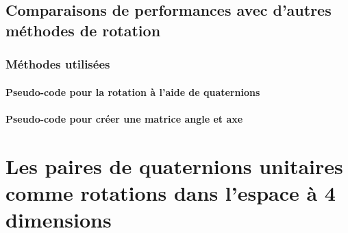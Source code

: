 	\subsection[Performances autres rotations]{Comparaisons de performances avec d'autres méthodes de rotation}
		
		
		\subsubsection{Méthodes utilisées}
			
			\paragraph{Pseudo-code pour la rotation à l'aide de quaternions}
				
			\paragraph{Pseudo-code pour créer une matrice angle et axe}
				
				
\section[Les paires de quaternions unitaires]{Les paires de quaternions unitaires comme rotations dans l'espace à 4 dimensions}
	